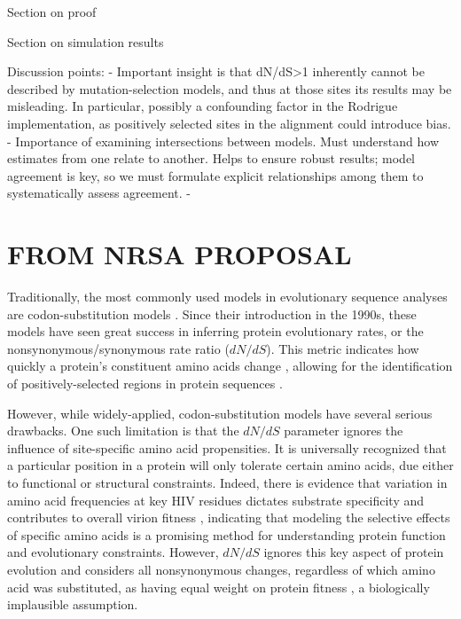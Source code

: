 \documentclass[11pt]{article}
\begin{document}
Section on proof

Section on simulation results

Discussion points:
- Important insight is that dN/dS>1 inherently cannot be described by mutation-selection models, and thus at those sites its results may be misleading. In particular, possibly a confounding factor in the Rodrigue implementation, as positively selected sites in the alignment could introduce bias.
- Importance of examining intersections between models. Must understand how estimates from one relate to another. Helps to ensure robust results; model agreement is key, so we must formulate explicit relationships among them to systematically assess agreement.
- 





\section*{FROM NRSA PROPOSAL}
Traditionally, the most commonly used models in evolutionary sequence analyses are codon-substitution models \cite{Anisimova2009}. Since their introduction in the 1990s, these models have seen great success in inferring protein evolutionary rates, or the nonsynonymous/synonymous rate ratio ($dN/dS$). This metric indicates how quickly a protein's constituent amino acids change \cite{GoldmanYang1994, MuseGaut1994, NielsenYang1998}, allowing for the identification of positively-selected regions in protein sequences \cite{ NielsenYang1998,Yang2000}. 

However, while widely-applied, codon-substitution models have several serious drawbacks. One such limitation is that the $dN/dS$ parameter ignores the influence of site-specific amino acid propensities.  It is universally recognized that a particular position in a protein will only tolerate certain amino acids, due either to functional or structural constraints. Indeed, there is evidence that variation in amino acid frequencies at key HIV residues dictates substrate specificity and contributes to overall virion fitness \cite{Bagossi2005,daSilva2006}, indicating that modeling the selective effects of specific amino acids is a promising method for understanding protein function and evolutionary constraints. However, $dN/dS$ ignores this key aspect of protein evolution and considers all nonsynonymous changes, regardless of which amino acid was substituted, as having equal weight on protein fitness \cite{HalpernBruno1998,Sella2005}, a biologically implausible assumption. 
\end{document}
